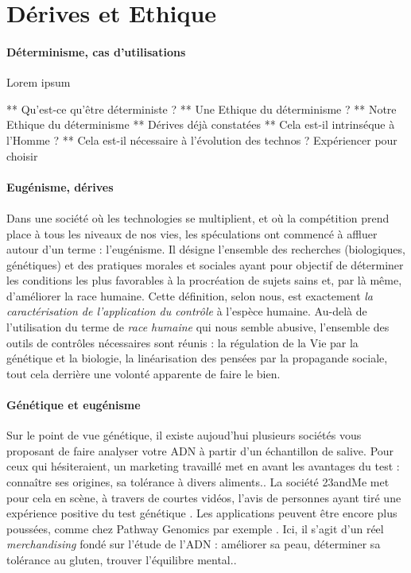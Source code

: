 \section{Dérives et Ethique}

\paragraph{Déterminisme, cas d'utilisations} Lorem ipsum

** Qu'est-ce qu'être déterministe ?
** Une Ethique du déterminisme ?
** Notre Ethique du déterminisme
** Dérives déjà constatées
** Cela est-il intrinséque à l'Homme ?
** Cela est-il nécessaire à l'évolution des technos ? Expériencer pour choisir

\paragraph{Eugénisme, dérives}

\paragraph{} Dans une société où les technologies se multiplient, et où la compétition prend place
à tous les niveaux de nos vies, les spéculations ont commencé à affluer autour d'un terme : l'eugénisme.
Il désigne l'ensemble des recherches (biologiques, génétiques) et des pratiques morales et sociales
ayant pour objectif de \guillemotleft déterminer les conditions les plus favorables à la procréation
de sujets sains et, par là même, d'améliorer la race humaine\guillemotright  \cite{Eugenisme0}. Cette
définition, selon nous, est exactement \emph{la caractérisation de l'application du contrôle} à l'espèce
humaine. Au-delà de l'utilisation du terme de \emph{race humaine} qui nous semble abusive, l'ensemble des
outils de contrôles nécessaires sont réunis : la régulation de la Vie par la génétique et la biologie, la
linéarisation des pensées par la propagande sociale, tout cela derrière une volonté apparente de faire le bien.

\paragraph{Génétique et eugénisme} Sur le point de vue génétique, il existe aujoud'hui plusieurs sociétés
vous proposant de faire analyser votre ADN à partir d'un échantillon de salive. Pour ceux qui hésiteraient,
un marketing travaillé met en avant les avantages du test : connaître ses origines, sa tolérance à divers
aliments.. La société 23andMe met pour cela en scène, à travers de courtes vidéos, l'avis de personnes
ayant tiré une expérience positive du test génétique \cite{23andMe}. Les applications peuvent être 
encore plus poussées, comme chez Pathway Genomics par exemple \cite{Pathway0}. Ici, il s'agit d'un réel
\emph{merchandising} fondé sur l'étude de l'ADN : améliorer sa peau, déterminer sa tolérance au gluten, 
trouver l'équilibre mental..

